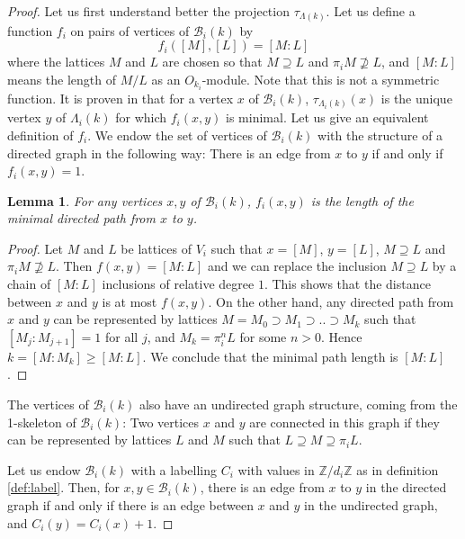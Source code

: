 \documentclass{amsart}
\theoremstyle{theorem}
\theoremstyle{lemma}
\newtheorem{lemma}{Lemma}[section]
\theoremstyle{prop}
\theoremstyle{definition}
\theoremstyle{corollary}
\theoremstyle{remark}
\newcommand{\Z}{\mathbb{Z}}
\newcommand{\B}{\mathcal{B}}
\begin{document}
\begin{proof}
Let us first understand better the projection $\tau_{\Lambda(k)}$. 
Let us define a function $f_i$ on pairs of vertices of $\B_i(k)$ by $$f_i([M],[L])=[M:L]$$ where the lattices $M$ and $L$ are chosen so that $M \supseteq L$ and $\pi_i M \nsupseteq L$, and $[M:L]$ means the length of $M/L$ as an $O_{k_i}$-module. Note that this is not a symmetric function. It is proven in \cite{ber} that for a vertex $x$ of $\mathcal{B}_i(k)$, $\tau_{\Lambda_i(k)}(x)$ is the unique vertex $y$ of $\Lambda_i(k)$ for which $f_i(x,y)$ is minimal.
Let us give an equivalent definition of $f_i$. We endow the set of vertices of $\B_i(k)$ with the structure of a directed graph in the following way: There is an edge from $x$ to $y$ if and only if $f_i(x,y)=1$. 
\begin{lemma}\label{minlen}
For any vertices $x,y$ of $\B_i(k)$,  $f_i(x,y)$ is the length of the minimal directed path from $x$ to $y$. 
\end{lemma}
\begin{proof}
Let $M$ and $L$ be lattices of $V_i$ such that $x=[M]$, $y=[L]$,  $M \supseteq L$ and $\pi_i M \nsupseteq L$. Then $f(x,y)=[M:L]$ and we can replace the inclusion $M\supseteq L$ by a chain of $[M:L]$ inclusions of relative degree $1$. This shows that the distance between $x$ and $y$ is at most $f(x,y)$. On the other hand, any directed path from $x$ and $y$ can be represented by lattices $M=M_0 \supset M_1 \supset .. \supset M_k$ such that $[M_j:M_{j+1}]=1$ for all $j$, and $M_k= \pi_i^n L$ for some $n>0$. Hence $k=[M:M_k] \geq [M:L]$. We conclude that the minimal path length is $[M:L]$.
\end{proof}
The vertices of $\B_i(k)$ also have an undirected graph structure, coming from the 1-skeleton of $\B_i(k)$: Two vertices $x$ and $y$ are connected in this graph if they can be represented by lattices $L$ and $M$ such that $L \supseteq M \supseteq \pi_i L$. 

Let us endow $\B_i(k)$ with a labelling $C_i$ with values in $\Z / d_i \Z$ as in definition \ref{def:label}. Then, for $x,y\in \B_i(k)$, there is an edge from $x$ to $y$ in the directed graph if and only if there is an edge between $x$ and $y$ in the undirected graph, and $C_i(y)=C_i(x)+1$. 


\end{proof}
\end{document}
